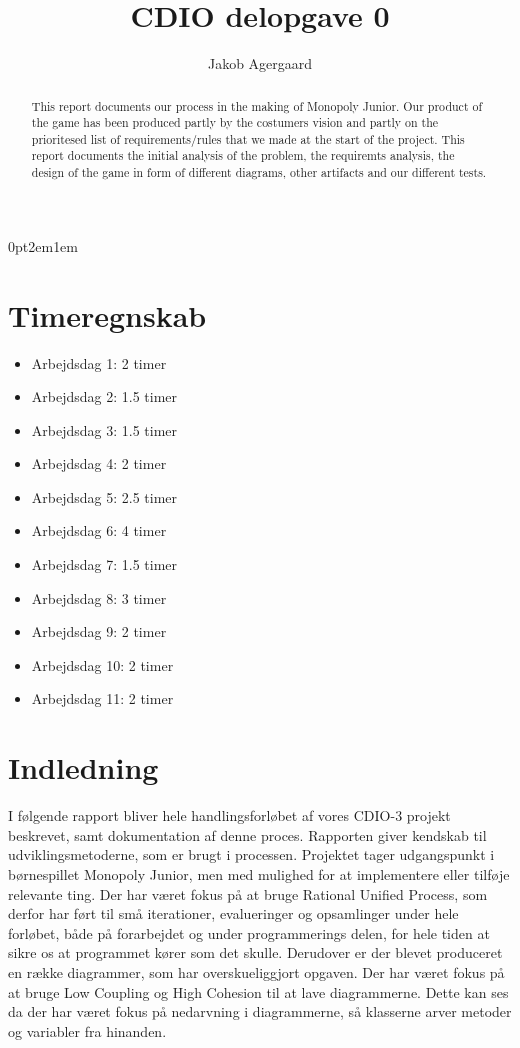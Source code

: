 \documentclass{article}
\title{CDIO delopgave 0}
\author{Jakob Agergaard}
\begin{document}
\titlespacing{\section}
    {0pt}{2em}{1em}



\normalsize
\begin{abstract}
This report documents our process in the making of Monopoly Junior. Our product of the game has been produced partly by the costumers vision and partly on the prioritesed list of requirements/rules that we made at the start of the project.
This report documents the initial analysis of the problem, the requiremts analysis, the design of the game in form of different diagrams, other artifacts and our different tests.


\end{abstract}
\break 

\tableofcontents
\break 

\section{Timeregnskab}
\begin{itemize}
    \item Arbejdsdag 1: 2 timer
    \item Arbejdsdag 2: 1.5 timer
    \item Arbejdsdag 3: 1.5 timer
    \item Arbejdsdag 4: 2 timer
    \item Arbejdsdag 5: 2.5 timer
    \item Arbejdsdag 6: 4 timer
    \item Arbejdsdag 7: 1.5 timer 
    \item Arbejdsdag 8: 3 timer
    \item Arbejdsdag 9: 2 timer
    \item Arbejdsdag 10: 2 timer
    \item Arbejdsdag 11: 2 timer
\end{itemize}
\section{Indledning}
I følgende rapport bliver hele handlingsforløbet af vores CDIO-3 projekt beskrevet, samt dokumentation af denne proces. Rapporten giver kendskab til udviklingsmetoderne, som er brugt i processen. Projektet tager udgangspunkt i børnespillet Monopoly Junior, men med mulighed for at implementere eller tilføje relevante ting. Der har været fokus på at bruge Rational Unified Process, som derfor har ført til små iterationer, evalueringer og opsamlinger under hele forløbet, både på forarbejdet og under programmerings delen, for hele tiden at sikre os at programmet kører som det skulle. Derudover er der blevet produceret en række diagrammer, som har overskueliggjort opgaven. Der har været fokus på at bruge Low Coupling og High Cohesion til at lave diagrammerne. Dette kan ses da der har været fokus på nedarvning i diagrammerne, så klasserne arver metoder og variabler fra hinanden. 
\end{document}
